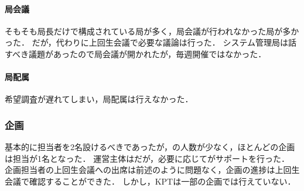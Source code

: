 \paragraph*{局会議}
そもそも局長だけで構成されている局が多く，局会議が行われなかった局が多かった．
だが，代わりに上回生会議で必要な議論は行った．
システム管理局は話すべき議題があったので局会議が開かれたが，毎週開催ではなかった．
\paragraph*{局配属}
希望調査が遅れてしまい，局配属は行えなかった．

\subsubsection*{企画}
基本的に担当者を2名設けるべきであったが，\secondGrade{}の人数が少なく，ほとんどの企画は担当が1名となった．
運営主体は\secondGrade{}だが，必要に応じて\thirdGrade{}がサポートを行った．
企画担当者の上回生会議への出席は前述のように問題なく，企画の進捗は上回生会議で確認することができた．
しかし，KPTは一部の企画では行えていない．
